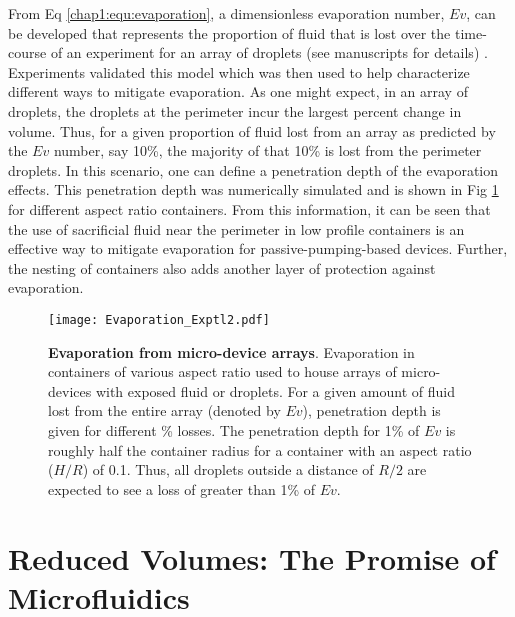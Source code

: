 From Eq \ref{chap1:equ:evaporation}, a dimensionless evaporation number, $Ev$, can be developed that represents the proportion of fluid that is lost over the time-course of an experiment for an array of droplets (see manuscripts for details) \cite{Berthier:2008jf,Berthier:2008tl}. Experiments validated this model which was then used to help characterize different ways to mitigate evaporation. As one might expect, in an array of droplets, the droplets at the perimeter incur the largest percent change in volume. Thus, for a given proportion of fluid lost from an array as predicted by the $Ev$ number, say 10\%, the majority of that 10\% is lost from the perimeter droplets. In this scenario, one can define a penetration depth of the evaporation effects. This penetration depth was numerically simulated and is shown in Fig \ref{chap1:fig:evaporation2} for different aspect ratio containers. From this information, it can be seen that the use of sacrificial fluid near the perimeter in low profile containers is an effective way to mitigate evaporation for passive-pumping-based devices. Further, the nesting of containers also adds another layer of protection against evaporation.

\begin{figure}[!ht]
\centering
\texttt{[image: Evaporation\_Exptl2.pdf]}
\caption{\textbf{Evaporation from micro-device arrays}. Evaporation in containers of various aspect ratio used to house arrays of micro-devices with exposed fluid or droplets. For a given amount of fluid lost from the entire array (denoted by $Ev$), penetration depth is given for different \% losses. The penetration depth for 1\% of $Ev$ is roughly half the container radius for a container with an aspect ratio ($H/R$) of 0.1. Thus, all droplets outside a distance of $R/2$ are expected to see a loss of greater than 1\% of $Ev$.}
\label{chap1:fig:evaporation2}
\end{figure}


\section{Reduced Volumes: The Promise of Microfluidics}

